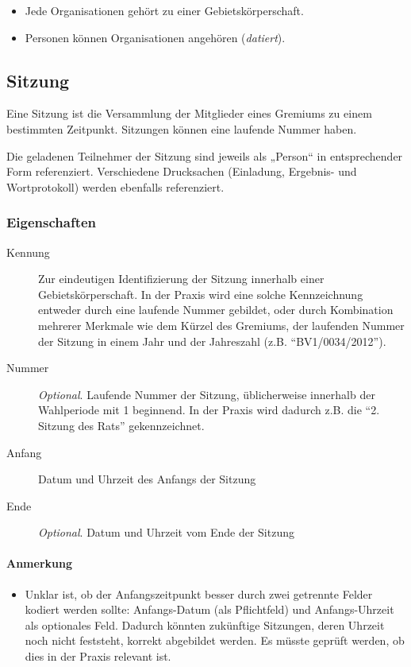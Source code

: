 \begin{itemize}
\item
  Jede Organisationen gehört zu einer Gebietskörperschaft.
\item
  Personen können Organisationen angehören (\emph{datiert}).
\end{itemize}

\subsection{Sitzung}

Eine Sitzung ist die Versammlung der Mitglieder eines Gremiums zu einem
bestimmten Zeitpunkt. Sitzungen können eine laufende Nummer haben.

Die geladenen Teilnehmer der Sitzung sind jeweils als „Person`` in
entsprechender Form referenziert. Verschiedene Drucksachen (Einladung,
Ergebnis- und Wortprotokoll) werden ebenfalls referenziert.

\subsubsection{Eigenschaften}

\begin{description}
\item[Kennung]
Zur eindeutigen Identifizierung der Sitzung innerhalb einer
Gebietskörperschaft. In der Praxis wird eine solche Kennzeichnung
entweder durch eine laufende Nummer gebildet, oder durch Kombination
mehrerer Merkmale wie dem Kürzel des Gremiums, der laufenden Nummer der
Sitzung in einem Jahr und der Jahreszahl (z.B. ``BV1/0034/2012'').
\item[Nummer]
\emph{Optional}. Laufende Nummer der Sitzung, üblicherweise innerhalb
der Wahlperiode mit 1 beginnend. In der Praxis wird dadurch z.B. die
``2. Sitzung des Rats'' gekennzeichnet.
\item[Anfang]
Datum und Uhrzeit des Anfangs der Sitzung
\item[Ende]
\emph{Optional}. Datum und Uhrzeit vom Ende der Sitzung
\end{description}

\paragraph{Anmerkung}

\begin{itemize}
\item
  Unklar ist, ob der Anfangszeitpunkt besser durch zwei getrennte Felder
  kodiert werden sollte: Anfangs-Datum (als Pflichtfeld) und
  Anfangs-Uhrzeit als optionales Feld. Dadurch könnten zukünftige
  Sitzungen, deren Uhrzeit noch nicht feststeht, korrekt abgebildet
  werden. Es müsste geprüft werden, ob dies in der Praxis relevant ist.
\end{itemize}

